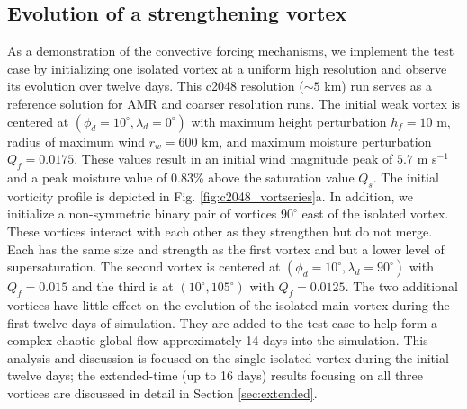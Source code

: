    \subsection{Evolution of a strengthening vortex}
   As a demonstration of the convective forcing mechanisms, we implement the test 
   case by initializing one isolated vortex at a uniform high resolution and observe
   its evolution over twelve days.
   This c2048 resolution ($\sim 5$ km) run serves as a reference solution 
   for AMR and coarser resolution runs. The initial weak vortex is centered at
   $(\phi_d =10^\circ ,  \lambda_d = 0^\circ)$ with maximum height perturbation $h_f=10$ m,
   radius of maximum wind $r_w= 600$ km, and maximum moisture perturbation
   $Q_f=0.0175$. These values result in an initial wind magnitude peak of $ 5.7$ m s$^{-1}$ and 
   a peak moisture value of 0.83\% above the saturation value $Q_s$. The initial vorticity 
   profile is depicted in Fig. \ref{fig:c2048_vortseries}a. In addition, we initialize 
   a non-symmetric binary pair of vortices $90^\circ$ east of the isolated vortex. These vortices 
   interact with each other as they strengthen but do not merge. Each has the same size 
   and strength as the first vortex and but a lower level of supersaturation. 
    The second vortex is centered at
   $(\phi_d =10^\circ , \lambda_d = 90^\circ)$ with $Q_f=0.015$ and the third is
   at $(10^\circ , 105^\circ)$ with $Q_f=0.0125$.
   The two additional vortices have little effect on the 
   evolution of the isolated main vortex during the first twelve days of simulation. They are added
   to the test case to help form a complex chaotic global flow approximately 14 days into the simulation. 
   This analysis and discussion is focused on the single 
   isolated vortex during the initial twelve days; the extended-time (up to 16 days) 
   results focusing on all three vortices are discussed in detail
   in Section \ref{sec:extended}. 
   
